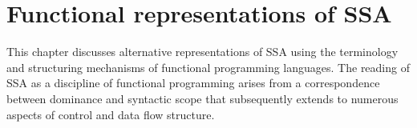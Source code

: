 \chapter{Functional representations of SSA }
\label{chapter:semantics}
\graphicspath{{img/}{semantics/img/}{part1/semantics/img/}}

\newcommand{\pdec}[3]{\ensuremath{\mathtt{proc}\ } {#1}\ \mathtt{(}{#2}\mathtt{)\ =} \ {#3}}
\newcommand{\letin}[3]{\ensuremath{\mathtt{let}\ {#1}\ \mathtt{=}\ {#2}\ 
                       \mathtt{in}\ {#3}\ \mathtt{end}}}
\newcommand{\letinD}[3]{\ensuremath{\mathtt{let}\ {#1}\ \mathtt{=}\ {#2}\ 
                       \mathtt{in}\ {#3}\ }}
\newcommand{\ite}[3]{\ensuremath{\mathtt{if}\ {#1}\ \mathtt{then}\ {#2}\
                        \mathtt{else}\ {#3}}}
\newcommand{\letrec}[2]{\ensuremath{\mathtt{fun}\ {#1}\ \mathtt{in}\ {#2}\ \mathtt{end}}}
\newcommand{\call}[2]{\ensuremath{{#1}\mathtt{(}{#2}\mathtt{)}}}
\newcommand{\decl}[0]{\ensuremath{\mathit{decl}}}
\newcommand{\uopsymbol}[0]{\ensuremath{\mathit{unop}}}
\newcommand{\bopsymbol}[0]{\ensuremath{\mathit{binop}}}
\newcommand{\uop}[1]{\ensuremath{\uopsymbol\ {#1}}}
\newcommand{\bop}[2]{\ensuremath{\bopsymbol\ {#1}\ {#2}}}
\newcommand{\simplejudge}[2]{{#1} \vdash {#2}}
\newcommand{\closenode}[3]{\mathtt{close}_{{#1}}({#2},{#3})}
\newcommand{\loopnode}[3]{\mathtt{loop}_{{#1}}({#2},{#3})}
\newcommand{\LV}{\ensuremath{\sc{Live}}}
\newcommand{\fv}{\ensuremath{\sc{Free}}}


\newcommand{\param}[1]{\ensuremath{\overrightarrow{p_{#1}}}}
\newcommand{\loopfun}{\ensuremath{\mathit{loop}}}


\label{section:Part1:Semantics:Intro}
This chapter discusses alternative representations of SSA using the
terminology and structuring mechanisms of functional programming
languages. The reading of SSA as a discipline of functional
programming arises from a correspondence between dominance and
syntactic scope that subsequently extends to numerous aspects of
control and data flow structure.

